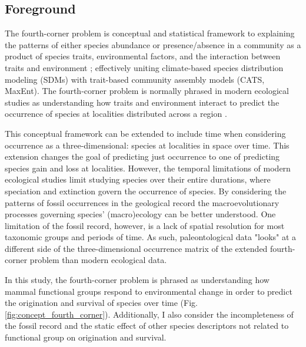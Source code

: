 \documentclass[12pt,letterpaper]{article}
\begin{document}
\subsection*{Foreground}

The fourth-corner problem is conceptual and statistical framework to explaining the patterns of either species abundance or presence/absence in a community as a product of species traits, environmental factors, and the interaction between traits and environment \citep{Brown2014c,Warton2015a,Pollock2012,Jamil2013}; effectively uniting climate-based species distribution modeling (SDMs) with trait-based community assembly models (CATS, MaxEnt). The fourth-corner problem is normally phrased in modern ecological studies as understanding how traits and environment interact to predict the occurrence of species at localities distributed across a region \citep{Pollock2012,Jamil2013}. 

This conceptual framework can be extended to include time when considering occurrence as a three-dimensional: species at localities in space over time. This extension changes the goal of predicting just occurrence to one of predicting species gain and loss at localities. However, the temporal limitations of modern ecological studies limit studying species over their entire durations, where speciation and extinction govern the occurrence of species. By considering the patterns of fossil occurrences in the geological record the macroevolutionary processes governing species' (macro)ecology can be better understood. One limitation of the fossil record, however, is a lack of spatial resolution for most taxonomic groups and periods of time. As such, paleontological data "looks" at a different side of the three-dimensional occurrence matrix of the extended fourth-corner problem than modern ecological data.

In this study, the fourth-corner problem is phrased as understanding how mammal functional groups respond to environmental change in order to predict the origination and survival of species over time (Fig. \ref{fig:concept_fourth_corner}). Additionally, I also consider the incompleteness of the fossil record and the static effect of other species descriptors not related to functional group on origination and survival. 
\end{document}
